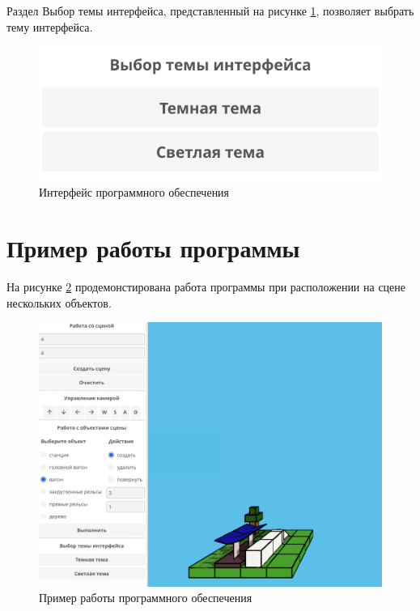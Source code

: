 Раздел \guillemotleft Выбор темы интерфейса\guillemotright, представленный на рисунке \ref{img:theme}, позволяет выбрать тему интерфейса.
\begin{figure}[h]
    \centering
    \includegraphics[width=0.7\linewidth]{img/theme.png}
    \caption{Интерфейс программного обеспечения}
    \label{img:theme}
\end{figure}
\noindent

\clearpage
\section{Пример работы программы}

На рисунке \ref{img:exmpl} продемонстирована работа программы при расположении на сцене нескольких объектов.

\begin{figure}[h]
    \centering
    \includegraphics[width=1\linewidth]{img/exmpl.png}
    \caption{Пример работы программного обеспечения}
    \label{img:exmpl}
\end{figure}
\noindent




